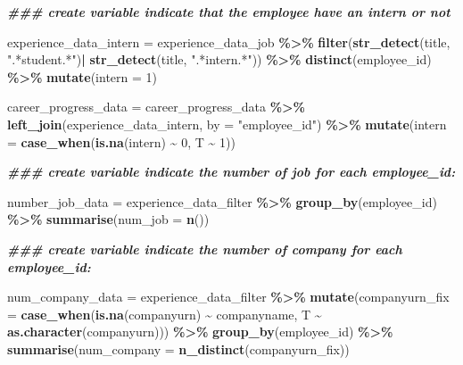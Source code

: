 \documentclass[11pt,]{article}
\newenvironment{Shaded}{\begin{snugshade}}{\end{snugshade}}
\newcommand{\AttributeTok}[1]{\textcolor[rgb]{0.13,0.29,0.53}{#1}}
\newcommand{\DecValTok}[1]{\textcolor[rgb]{0.00,0.00,0.81}{#1}}
\newcommand{\DocumentationTok}[1]{\textcolor[rgb]{0.56,0.35,0.01}{\textbf{\textit{#1}}}}
\newcommand{\FunctionTok}[1]{\textcolor[rgb]{0.13,0.29,0.53}{\textbf{#1}}}
\newcommand{\NormalTok}[1]{#1}
\newcommand{\OtherTok}[1]{\textcolor[rgb]{0.56,0.35,0.01}{#1}}
\newcommand{\SpecialCharTok}[1]{\textcolor[rgb]{0.81,0.36,0.00}{\textbf{#1}}}
\newcommand{\StringTok}[1]{\textcolor[rgb]{0.31,0.60,0.02}{#1}}
\begin{document}
\begin{Shaded}
\begin{Highlighting}[]
\DocumentationTok{\#\#\# create variable indicate that the employee have an intern or not}


\NormalTok{experience\_data\_intern }\OtherTok{=}\NormalTok{ experience\_data\_job }\SpecialCharTok{\%\textgreater{}\%} 
  \FunctionTok{filter}\NormalTok{(}\FunctionTok{str\_detect}\NormalTok{(title, }\StringTok{".*student.*"}\NormalTok{)}\SpecialCharTok{|}
           \FunctionTok{str\_detect}\NormalTok{(title, }\StringTok{".*intern.*"}\NormalTok{)) }\SpecialCharTok{\%\textgreater{}\%} \FunctionTok{distinct}\NormalTok{(employee\_id) }\SpecialCharTok{\%\textgreater{}\%} 
  \FunctionTok{mutate}\NormalTok{(}\AttributeTok{intern =} \DecValTok{1}\NormalTok{)}


\NormalTok{career\_progress\_data }\OtherTok{=}\NormalTok{ career\_progress\_data }\SpecialCharTok{\%\textgreater{}\%}
  \FunctionTok{left\_join}\NormalTok{(experience\_data\_intern, }\AttributeTok{by =} \StringTok{"employee\_id"}\NormalTok{) }\SpecialCharTok{\%\textgreater{}\%} 
  \FunctionTok{mutate}\NormalTok{(}\AttributeTok{intern =} \FunctionTok{case\_when}\NormalTok{(}\FunctionTok{is.na}\NormalTok{(intern) }\SpecialCharTok{\textasciitilde{}} \DecValTok{0}\NormalTok{,}
\NormalTok{                            T }\SpecialCharTok{\textasciitilde{}} \DecValTok{1}\NormalTok{))}


\DocumentationTok{\#\#\# create variable indicate the number of job for each employee\_id:}

\NormalTok{number\_job\_data }\OtherTok{=}\NormalTok{ experience\_data\_filter }\SpecialCharTok{\%\textgreater{}\%} 
  \FunctionTok{group\_by}\NormalTok{(employee\_id) }\SpecialCharTok{\%\textgreater{}\%} 
  \FunctionTok{summarise}\NormalTok{(}\AttributeTok{num\_job =} \FunctionTok{n}\NormalTok{())}

\DocumentationTok{\#\#\# create variable indicate the number of company for each employee\_id:}

\NormalTok{num\_company\_data }\OtherTok{=}\NormalTok{ experience\_data\_filter }\SpecialCharTok{\%\textgreater{}\%} 
  \FunctionTok{mutate}\NormalTok{(}\AttributeTok{companyurn\_fix =} \FunctionTok{case\_when}\NormalTok{(}\FunctionTok{is.na}\NormalTok{(companyurn) }\SpecialCharTok{\textasciitilde{}}\NormalTok{ companyname,}
\NormalTok{                                    T }\SpecialCharTok{\textasciitilde{}} \FunctionTok{as.character}\NormalTok{(companyurn))) }\SpecialCharTok{\%\textgreater{}\%} 
  \FunctionTok{group\_by}\NormalTok{(employee\_id) }\SpecialCharTok{\%\textgreater{}\%} 
  \FunctionTok{summarise}\NormalTok{(}\AttributeTok{num\_company =} \FunctionTok{n\_distinct}\NormalTok{(companyurn\_fix))}



\end{Highlighting}
\end{Shaded}
\end{document}
